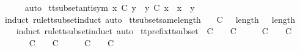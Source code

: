 \ \ \ \ \isamarkupfalse%
\ auto\isanewline
{}\isamarkupfalse%
%
\endisatagproof
{\isafoldproof}%
%
\isadelimproof
\isanewline
%
\endisadelimproof
\isanewline
{}\isamarkupfalse%
\ tt{\isacharunderscore}subset{\isacharunderscore}antisym{\isacharcolon}\ {\isachardoublequoteopen}x\ {\isasymsubseteq}\isactrlsub C\ y\ {\isasymLongrightarrow}\ y\ {\isasymsubseteq}\isactrlsub C\ x\ {\isasymLongrightarrow}\ x\ {\isacharequal}\ y{\isachardoublequoteclose}\isanewline
%
\isadelimproof
\ \ %
\endisadelimproof
%
\isatagproof
{}\isamarkupfalse%
\ {\isacharparenleft}induct\ rule{\isacharcolon}tt{\isacharunderscore}subset{\isachardot}induct{\isacharcomma}\ auto{\isacharparenright}%
\endisatagproof
{\isafoldproof}%
%
\isadelimproof
\isanewline
%
\endisadelimproof
\isanewline
{}\isamarkupfalse%
\ tt{\isacharunderscore}subset{\isacharunderscore}same{\isacharunderscore}length{\isacharcolon}\isanewline
\ \ {\isachardoublequoteopen}{\isasymrho}\ {\isasymsubseteq}\isactrlsub C\ {\isasymsigma}\ {\isasymLongrightarrow}\ length\ {\isasymrho}\ {\isacharequal}\ length\ {\isasymsigma}{\isachardoublequoteclose}\isanewline
%
\isadelimproof
\ \ %
\endisadelimproof
%
\isatagproof
{}\isamarkupfalse%
\ {\isacharparenleft}induct\ rule{\isacharcolon}tt{\isacharunderscore}subset{\isachardot}induct{\isacharcomma}\ auto{\isacharparenright}%
\endisatagproof
{\isafoldproof}%
%
\isadelimproof
\isanewline
%
\endisadelimproof
\isanewline
{}\isamarkupfalse%
\ tt{\isacharunderscore}prefix{\isacharunderscore}tt{\isacharunderscore}subset{\isacharcolon}\ {\isachardoublequoteopen}{\isasymsigma}{\isacharprime}\ {\isasymle}\isactrlsub C\ {\isasymsigma}\ {\isasymLongrightarrow}\ {\isasymrho}\ {\isasymsubseteq}\isactrlsub C\ {\isasymsigma}\ {\isasymLongrightarrow}\ {\isasymexists}\ {\isasymrho}{\isacharprime}{\isachardot}\ {\isasymrho}{\isacharprime}\ {\isasymsubseteq}\isactrlsub C\ {\isasymsigma}{\isacharprime}\ {\isasymand}\ {\isasymrho}{\isacharprime}\ {\isasymle}\isactrlsub C\ {\isasymrho}{\isachardoublequoteclose}\isanewline
%
\isadelimproof
%
\endisadelimproof
%
\isatagproof
{}\isamarkupfalse%
\ {\isacharminus}\isanewline
\ \ \isamarkupfalse%
\ {\isachardoublequoteopen}{\isasymAnd}\ {\isasymsigma}{\isacharprime}{\isachardot}\ {\isasymsigma}{\isacharprime}\ {\isasymle}\isactrlsub C\ {\isasymsigma}\ {\isasymLongrightarrow}\ {\isasymrho}\ {\isasymsubseteq}\isactrlsub C\ {\isasymsigma}\ {\isasymLongrightarrow}\ {\isasymexists}\ {\isasymrho}{\isacharprime}{\isachardot}\ {\isasymrho}{\isacharprime}\ {\isasymsubseteq}\isactrlsub C\ {\isasymsigma}{\isacharprime}\ {\isasymand}\ {\isasymrho}{\isacharprime}\ {\isasymle}\isactrlsub C\ {\isasymrho}{\isachardoublequoteclose}\isanewline
